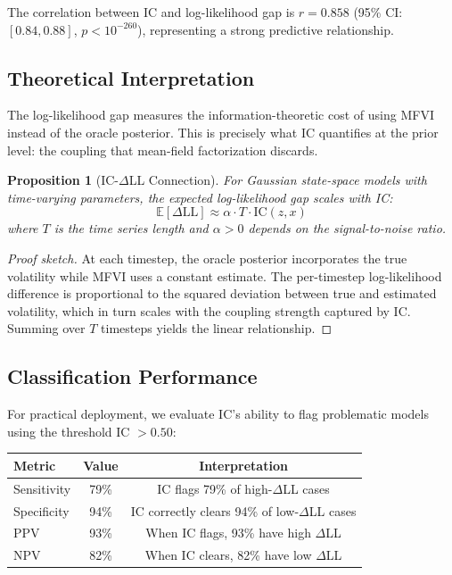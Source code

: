 \documentclass[10pt]{article} %
\theoremstyle{plain}
\newtheorem{proposition}[theorem]{Proposition}
\theoremstyle{definition}
\newcommand{\IC}{\mathrm{IC}}  %
\begin{document}
The correlation between IC and log-likelihood gap is $r = 0.858$ (95\% CI: $[0.84, 0.88]$, $p < 10^{-260}$), representing a strong predictive relationship.

\subsection{Theoretical Interpretation}

The log-likelihood gap measures the information-theoretic cost of using MFVI instead of the oracle posterior. This is precisely what IC quantifies at the prior level: the coupling that mean-field factorization discards.

\begin{proposition}[IC-$\Delta$LL Connection]
\label{prop:cf-ll}
For Gaussian state-space models with time-varying parameters, the expected log-likelihood gap scales with IC:
\begin{equation}
\mathbb{E}[\Delta\text{LL}] \approx \alpha \cdot T \cdot \IC(z, x)
\end{equation}
where $T$ is the time series length and $\alpha > 0$ depends on the signal-to-noise ratio.
\end{proposition}

\begin{proof}[Proof sketch]
At each timestep, the oracle posterior incorporates the true volatility while MFVI uses a constant estimate. The per-timestep log-likelihood difference is proportional to the squared deviation between true and estimated volatility, which in turn scales with the coupling strength captured by IC. Summing over $T$ timesteps yields the linear relationship.
\end{proof}

\subsection{Classification Performance}

For practical deployment, we evaluate IC's ability to flag problematic models using the threshold IC $> 0.50$:

\begin{center}
\begin{tabular}{lcc}
\toprule
Metric & Value & Interpretation \\
\midrule
Sensitivity & 79\% & IC flags 79\% of high-$\Delta$LL cases \\
Specificity & 94\% & IC correctly clears 94\% of low-$\Delta$LL cases \\
PPV & 93\% & When IC flags, 93\% have high $\Delta$LL \\
NPV & 82\% & When IC clears, 82\% have low $\Delta$LL \\
\bottomrule
\end{tabular}
\end{center}
\end{document}
